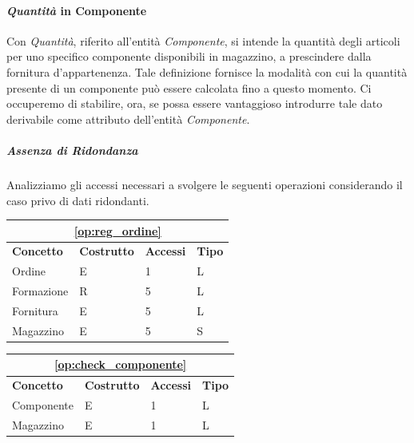 			\paragraph{\emph{Quantità} in Componente}
				Con \emph{Quantità}, riferito all'entità \emph{Componente}, si intende la quantità degli articoli per uno specifico componente disponibili in magazzino, a prescindere dalla fornitura d'appartenenza.
				Tale definizione fornisce la modalità con cui la quantità presente di un componente può essere calcolata fino a questo momento. Ci occuperemo di stabilire, ora, se possa essere vantaggioso introdurre tale dato derivabile come attributo dell'entità \emph{Componente}.

				\subparagraph{Assenza di Ridondanza}
					Analizziamo gli accessi necessari a svolgere le seguenti operazioni considerando il caso privo di dati ridondanti.

					\vspace{2ex}
					\begin{tabular}{| p{3cm} | p{3cm} | p{3cm} | p{3cm} |}
						\hline
						\multicolumn{4}{|c|}{\textbf{\ref{op:reg_ordine}}} \\ \hline
						\textbf{Concetto} & \textbf{Costrutto} & \textbf{Accessi} & \textbf{Tipo} \\ \hline
						Ordine 		& E & 1 & L \\
						Formazione	& R & 5 & L \\
						Fornitura 	& E & 5 & L \\
						Magazzino  	& E & 5 & S \\
						\hline
					\end{tabular}

					\begin{tabular}{| p{3cm} | p{3cm} | p{3cm} | p{3cm} |}
						\hline
						\multicolumn{4}{|c|}{\textbf{\ref{op:check_componente}}} \\ \hline
						\textbf{Concetto} & \textbf{Costrutto} & \textbf{Accessi} & \textbf{Tipo} \\ \hline
						Componente 	& E & 1 & L \\
						Magazzino 	& E & 1\footnotemark & L \\
						\hline
					\end{tabular}


